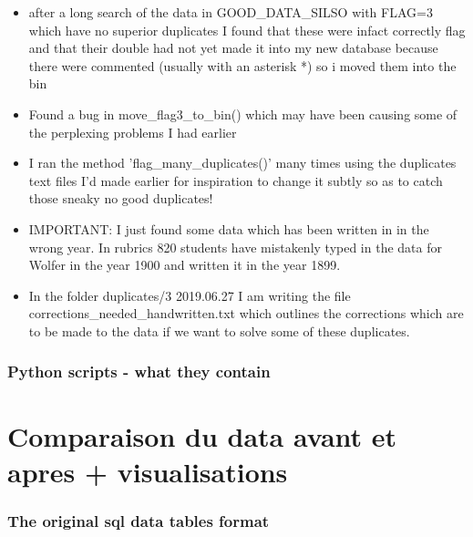 \documentclass[12pt]{article}
\begin{document}
\begin{itemize}
\begin{itemize}
        \item after a long search of the data in GOOD\_DATA\_SILSO with FLAG=3 which have no superior duplicates I found that these were infact correctly flag and that their double had not yet made it into my new database because there were commented (usually with an asterisk *) so i moved them into the bin
        \item Found a bug in move\_flag3\_to\_bin() which may have been causing some of the perplexing problems I had earlier
        \item I ran the method 'flag\_many\_duplicates()' many times using the duplicates text files I'd made earlier for inspiration to change it subtly so as to catch those sneaky no good duplicates!
        \item IMPORTANT: I just found some data which has been written in in the wrong year. In rubrics 820 students have mistakenly typed in the data for Wolfer in the year 1900 and written it in the year 1899.
        \item In the folder duplicates/3 2019.06.27 I am writing the file corrections\_needed\_handwritten.txt which outlines the corrections which are to be made to the data if we want to solve some of these duplicates.
    \end{itemize}
    
\end{itemize}

\subsubsection{Python scripts - what they contain}



\section{Comparaison du data avant et apres + visualisations}

\subsubsection{The original sql data tables format}
\end{document}

